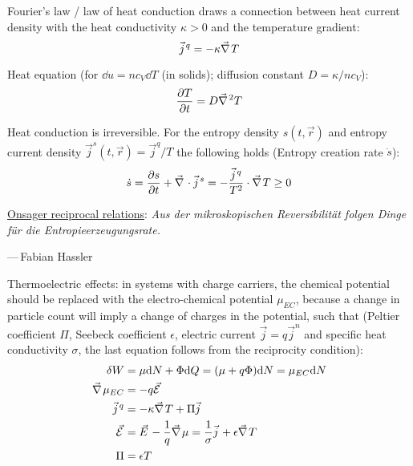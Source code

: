 		\noindent
		Fourier's law / law of heat conduction draws a connection between heat current density with the heat conductivity $\kappa >0$ and the temperature gradient:
		\begin{equation}
			\vec{j}^q = -\kappa \Nabla T
		\end{equation}

		\noindent
		Heat equation (for $\dd u = nc_V \dd T$ (\eg in solids); diffusion constant $D=\kappa/nc_V$):
		\begin{equation}
			\pdv{T}{t} = D\Nabla^2 T
		\end{equation}

		\noindent
		Heat conduction is irreversible. For the entropy density $s(t,\vec{r})$ and entropy current density $\vec{j}^s (t,\vec{r}) = \vec{j}^q/T$ the following holds (Entropy creation rate $\dot{s}$):
		\begin{equation}
			\dot{s} = \pdv{s}{t} + \Nabla\cdot\vec{j}^s = - \frac{\vec{j}^q}{T^2}\cdot\Nabla T \ge 0
		\end{equation}

		\noindent
		\href{https://en.wikipedia.org/wiki/Onsager_reciprocal_relations}{Onsager reciprocal relations}:
		\newline\indent\emph{Aus der mikroskopischen Reversibilität folgen Dinge für die Entropieerzeugungsrate.} %

		\hfill ---\,Fabian Hassler\vsp

		\noindent
		Thermoelectric effects: in systems with charge carriers, the chemical potential should be replaced with the electro-chemical potential $\mu_{EC}$, because a change in particle count will imply a change of charges in the potential, such that (Peltier coefficient $\Pi$, Seebeck coefficient $\epsilon$, electric current $\vec{j} = q\vec{j}^n$ and specific heat conductivity $\sigma$, the last equation follows from the reciprocity condition):
		\begin{equation}
			\begin{aligned}
				\delta W &= \mu \dd N + \Phi \dd Q = (\mu+q\Phi)\dd N = \mu_{EC} \dd N \\
				\Nabla \mu_{EC} &= -q\vec{\mathcal{E}} \\
				\vec{j}^q &= - \kappa \Nabla T + \Pi \vec{j} \\
				\vec{\mathcal{E}} &= \vec{E} - \frac{1}{q} \Nabla \mu = \frac{1}{\sigma} \vec{j} + \epsilon \Nabla T \\
				\Pi &= \epsilon T \\
			\end{aligned}
		\end{equation}

